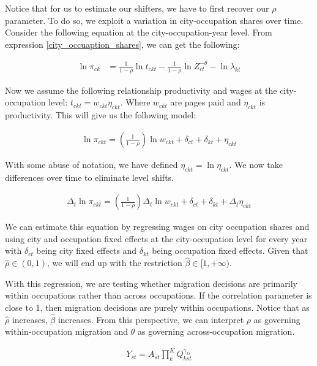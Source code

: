 \documentclass[10pt]{article}
\begin{document}
Notice that for us to estimate our shifters, we have to first recover our $\rho$ parameter. To do so, we exploit a variation in city-occupation shares over time. Consider the following equation at the city-occupation-year level. From expression \ref{city_occuaption_shares}, we can get the following:

\begin{align*}
    \ln \pi_{ck} & = \frac{1}{1 - \rho} \ln t_{ckt} - \frac{1}{1 - \rho} \ln Z_{ct}^{- \theta} - \ln \lambda_{kt}
\end{align*}

Now we assume the following relationship productivity and wages at the city-occupation level: $t_{ckt} = w_{ckt} \eta_{ckt}$. Where $w_{ckt}$ are pages paid and $\eta_{ckt}$ is productivity. This will give us the following model:

\begin{align*}
    \ln \pi_{ckt} = \left( \frac{1}{1 - \rho} \right) \ln w_{ckt} + \delta_{ct} + \delta_{kt} + \eta_{ckt}
\end{align*}

With some abuse of notation, we have defined $\eta_{ckt} = \ln \eta_{ckt}$. We now take differences over time to eliminate level shifts.

\begin{align*}
    \Delta_t \ln \pi_{ckt} = \left( \frac{1}{1 - \rho} \right) \Delta_t \ln w_{ckt} + \delta_{ct} + \delta_{kt} + \Delta_t \eta_{ckt}
\end{align*}

We can estimate this equation by regressing wages on city occupation shares and using city and occupation fixed effects at the city-occupation level for every year with $\delta_{ct}$ being city fixed effects and $\delta_{kt}$ being occupation fixed effects. Given that $\hat{\rho} \in (0, 1)$, we will end up with the restriction $\hat{\beta} \in [1, +\infty)$.

With this regression, we are testing whether migration decisions are primarily within occupations rather than across occupations. If the correlation parameter is close to 1, then migration decisions are purely within occupations. Notice that as $\hat{\rho}$ increases, $\hat{\beta}$ increases. From this perspective, we can interpret $\rho$ as governing within-occupation migration and $\theta$ as governing across-occupation migration.

\begin{align*}
    Y_{st} = A_{st} \prod_{k}^{K} Q_{kst}^{\gamma_{ks}}
\end{align*}
\end{document}
